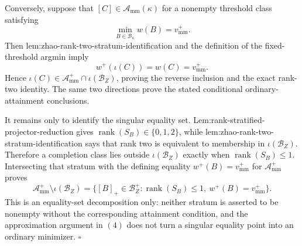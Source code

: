 Conversely, suppose that \([C]\in\mathcal A_{\mathrm{mm}}(\kappa)\) for a nonempty threshold class satisfying
\[
\min_{B\in\mathcal B_\kappa}w(B)=v_{\mathrm{mm}}^+.
\]
Then lem:zhao-rank-two-stratum-identification and the definition of the fixed-threshold argmin imply
\[
w^+(\iota(C))=w(C)=v_{\mathrm{mm}}^+.
\]
Hence \(\iota(C)\in\mathcal A_{\mathrm{mm}}^+\cap\iota(\mathcal B_Z)\), proving the reverse inclusion and the exact rank-two identity.  The same two directions prove the stated conditional ordinary-attainment conclusions.

It remains only to identify the singular equality set.  Lem:rank-stratified-projector-reduction gives \(\operatorname{rank}(S_B)\in\{0,1,2\}\), while lem:zhao-rank-two-stratum-identification says that rank two is equivalent to membership in \(\iota(\mathcal B_Z)\).  Therefore a completion class lies outside \(\iota(\mathcal B_Z)\) exactly when \(\operatorname{rank}(S_B)\le1\).  Intersecting that stratum with the defining equality \(w^+(B)=v_{\mathrm{mm}}^+\) for \(\mathcal A_{\mathrm{mm}}^+\) proves
\[
\mathcal A_{\mathrm{mm}}^+\setminus\iota(\mathcal B_Z)
=\{[B]_+\in\mathcal B_Z^+:\operatorname{rank}(S_B)\le1,\ w^+(B)=v_{\mathrm{mm}}^+\}.
\]
This is an equality-set decomposition only: neither stratum is asserted to be nonempty without the corresponding attainment condition, and the approximation argument in \((4)\) does not turn a singular equality point into an ordinary minimizer. \(\square\)
